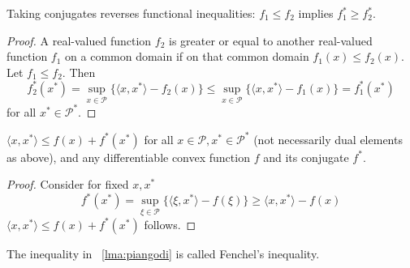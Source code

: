 \documentclass[12pt]{article}
\begin{document}
\begin{lemma}
  \label{lma:pudiubao}
  Taking conjugates reverses functional inequalities:
  $f_{1}\leq{}f_{2}$ implies $f_{1}^{\ast}\geq{}f_{2}^{\ast}$. 
\end{lemma}
\begin{proof}
  \label{prf:aibaelee}
  A real-valued function $f_{2}$ is greater or equal to another
  real-valued function $f_{1}$ on a common domain if on that common
  domain $f_{1}(x)\leq{}f_{2}(x)$. Let $f_{1}\leq{}f_{2}$. Then
  \begin{equation}
    \label{eq:zeewooje}
    f_{2}^{\ast}(x^{\ast})=\sup_{x\in\mathcal{P}}\{\langle{}x,x^{\ast}\rangle-f_{2}(x)\}\leq\sup_{x\in\mathcal{P}}\{\langle{}x,x^{\ast}\rangle-f_{1}(x)\}=f_{1}^{\ast}(x^{\ast})
  \end{equation}
for all $x^{\ast}\in\mathcal{P}^{\ast}$.
\end{proof}

\begin{lemma}
  \label{lma:piangodi}
  $\langle{}x,x^{\ast}\rangle\leq{}f(x)+f^{\ast}(x^{\ast})$ for all
  $x\in\mathcal{P},x^{\ast}\in\mathcal{P}^{\ast}$ (not necessarily
  dual elements as above), and any differentiable convex function $f$
  and its conjugate $f^{\ast}$.
\end{lemma}
\begin{proof}
  \label{prf:mohgeeph}
Consider for fixed $x,x^{\ast}$
\begin{equation}
  \label{eq:poyishoo}
  f^{\ast}(x^{\ast})=\sup_{\xi\in\mathcal{P}}\{\langle\xi,x^{\ast}\rangle-f(\xi)\}\geq\langle{}x,x^{\ast}\rangle-f(x)
\end{equation}
$\langle{}x,x^{\ast}\rangle\leq{}f(x)+f^{\ast}(x^{\ast})$ follows.
\end{proof}


The inequality in {\emma}~\ref{lma:piangodi} is called Fenchel's
inequality.
\end{document}
